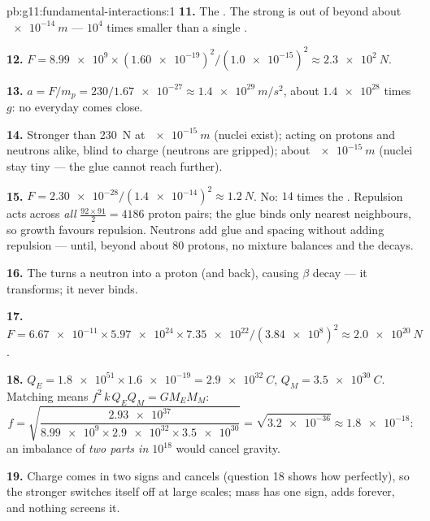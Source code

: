 \begin{solution}{pb:g11:fundamental-interactions:1}
\textbf{11.} The . The strong  is out
of  beyond about $\qty{e-14}{m}$ --- $10^{4}$ times smaller than a
single .

\textbf{12.} $F = \num{8.99e9} \times (\num{1.60e-19})^2 /
(\num{1.0e-15})^2 \approx \qty{2.3e2}{N}$.

\textbf{13.} $a = F/m_p = 230/\num{1.67e-27} \approx
\qty{1.4e29}{m/s^2}$, about $\num{1.4e28}$ times $g$: no everyday 
comes close.

\textbf{14.} Stronger than \qty{230}{N} at $\qty{e-15}{m}$ (nuclei
exist); acting on protons and neutrons alike, blind to charge (neutrons
are gripped);  about $\qty{e-15}{m}$ (nuclei stay tiny --- the
glue cannot reach further).

\textbf{15.} $F = \num{2.30e-28}/(\num{1.4e-14})^2 \approx
\qty{1.2}{N}$. No: $14$ times the . Repulsion acts across
\emph{all} $\frac{92\times91}{2} = 4186$ proton pairs; the glue binds
only nearest neighbours, so growth favours repulsion. Neutrons add glue
and spacing without adding repulsion --- until, beyond about $80$
protons, no mixture balances and the  decays.

\textbf{16.} The  turns a neutron into a proton (and
back), causing $\beta$ decay --- it transforms; it never binds.

\textbf{17.} $F = \num{6.67e-11} \times \num{5.97e24} \times
\num{7.35e22}/(\num{3.84e8})^2 \approx \qty{2.0e20}{N}$.

\textbf{18.} $Q_E = \num{1.8e51} \times \num{1.6e-19} =
\qty{2.9e32}{C}$, $Q_M = \qty{3.5e30}{C}$. Matching  means
$f^2\,k\,Q_E Q_M = G M_E M_M$:
\[
f = \sqrt{\frac{\num{2.93e37}}{\num{8.99e9} \times \num{2.9e32}
\times \num{3.5e30}}} = \sqrt{\num{3.2e-36}} \approx \num{1.8e-18} :
\]
an imbalance of \emph{two parts in $10^{18}$} would cancel gravity.

\textbf{19.} Charge comes in two signs and cancels (question 18 shows
how perfectly), so the stronger  switches itself off at large
scales; mass has one sign, adds forever, and nothing screens it.


\end{solution}
